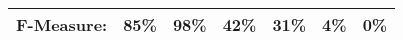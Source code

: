 \begin{table}
{\begin{tabular}{l|ll|ll|ll}
{\bf F-Measure:}                & \multicolumn{1}{l}{\bf 85\%} & \multicolumn{1}{l|}{\bf  98\%} & \multicolumn{1}{l}{\bf  42\%} & 
\multicolumn{1}{l|}{\bf 31\%} & \multicolumn{1}{l}{\bf 4\%} & \multicolumn{1}{l}{\bf 0\%}  \\ 
\hline
\hline

\end{tabular}
}
\end{table}

